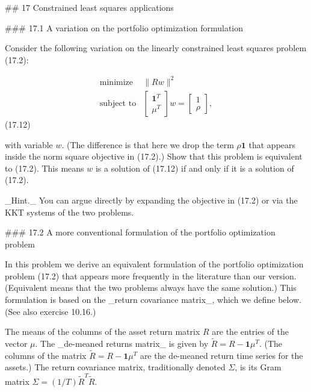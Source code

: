 

## 17 Constrained least squares applications

### 17.1 A variation on the portfolio optimization formulation

Consider the following variation on the linearly constrained least squares problem (17.2):

\[\begin{array}{ll}\mbox{minimize}&\|Rw\|^{2}\\ \mbox{subject to}&\left[\begin{array}{c}\mathbf{1}^{T}\\ \mu^{T}\end{array}\right]w=\left[\begin{array}{c}1\\ \rho\end{array}\right],\end{array}\] (17.12)

with variable \(w\). (The difference is that here we drop the term \(\rho\mathbf{1}\) that appears inside the norm square objective in (17.2).) Show that this problem is equivalent to (17.2). This means \(w\) is a solution of (17.12) if and only if it is a solution of (17.2).

_Hint._ You can argue directly by expanding the objective in (17.2) or via the KKT systems of the two problems.

### 17.2 A more conventional formulation of the portfolio optimization problem

In this problem we derive an equivalent formulation of the portfolio optimization problem (17.2) that appears more frequently in the literature than our version. (Equivalent means that the two problems always have the same solution.) This formulation is based on the _return covariance matrix_, which we define below. (See also exercise 10.16.)

The means of the columns of the asset return matrix \(R\) are the entries of the vector \(\mu\). The _de-meaned returns matrix_ is given by \(\tilde{R}=R-\mathbf{1}\mu^{T}\). (The columns of the matrix \(\tilde{R}=R-\mathbf{1}\mu^{T}\) are the de-meaned return time series for the assets.) The return covariance matrix, traditionally denoted \(\Sigma\), is its Gram matrix \(\Sigma=(1/T)\tilde{R}^{T}\tilde{R}\).

